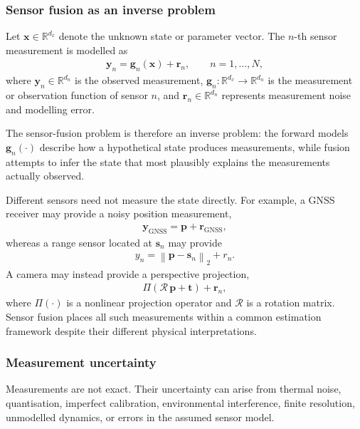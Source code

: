 \documentclass{ieeeaccess}
\begin{document}
\subsubsection{Sensor fusion as an inverse problem}
Let $\mathbf{x}\in\mathbb{R}^{d_x}$ denote the unknown state or parameter vector. The $n$-th sensor measurement is modelled as
\begin{align}
\mathbf{y}_n=\mathbf{g}_n(\mathbf{x})+\mathbf{r}_n, \qquad n=1,\ldots,N,
\end{align}
where $\mathbf{y}_n\in\mathbb{R}^{d_n}$ is the observed measurement, $\mathbf{g}_n:\mathbb{R}^{d_x}\rightarrow\mathbb{R}^{d_n}$ is the measurement or observation function of sensor $n$, and $\mathbf{r}_n\in\mathbb{R}^{d_n}$ represents measurement noise and modelling error.

The sensor-fusion problem is therefore an inverse problem: the forward models $\mathbf{g}_n(\cdot)$ describe how a hypothetical state produces measurements, while fusion attempts to infer the state that most plausibly explains the measurements actually observed. 

Different sensors need not measure the state directly. For example, a GNSS receiver may provide a noisy position measurement,
\begin{align*}
\mathbf{y}_{\mathrm{GNSS}}=\mathbf{p}+\mathbf{r}_{\mathrm{GNSS}},
\end{align*}
whereas a range sensor located at $\mathbf{s}_n$ may provide
\begin{align*}
y_n=\left\|\mathbf{p}-\mathbf{s}_n\right\|_2+r_n.
\end{align*}
A camera may instead provide a perspective projection,
\begin{align*}
\Pi\left(\boldsymbol{\mathcal{R}}\,\mathbf{p}+\mathbf{t}\right) +\mathbf{r}_n,
\end{align*}
where $\Pi(\cdot)$ is a nonlinear projection operator and $\boldsymbol{\mathcal{R}}$ is a rotation matrix. Sensor fusion places all such measurements within a common estimation framework despite their different physical interpretations.

\subsubsection{Measurement uncertainty}
Measurements are not exact. Their uncertainty can arise from thermal noise, quantisation, imperfect calibration, environmental interference, finite resolution, unmodelled dynamics, or errors in the assumed sensor model.
\end{document}
